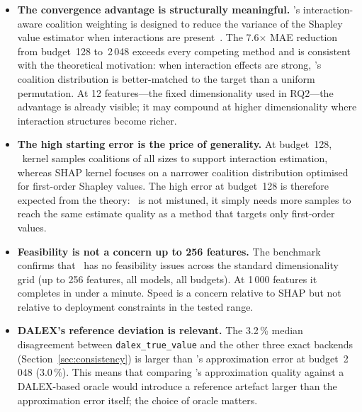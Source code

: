 \begin{itemize}

  \item \textbf{The convergence advantage is structurally meaningful.}
  \shapiq's interaction-aware coalition weighting is designed to reduce
  the variance of the Shapley value estimator when interactions are
  present~\cite{shapiq2024}.
  The 7.6$\times$ MAE reduction from budget~128 to~2\,048 exceeds every
  competing method and is consistent with the theoretical motivation:
  when interaction effects are strong, \shapiq's coalition distribution
  is better-matched to the target than a uniform permutation.
  At 12 features---the fixed dimensionality used in RQ2---the advantage
  is already visible; it may compound at higher dimensionality where
  interaction structures become richer.

  \item \textbf{The high starting error is the price of generality.}
  At budget~128, \shapiq\ kernel samples coalitions of all sizes to
  support interaction estimation, whereas SHAP kernel focuses on a
  narrower coalition distribution optimised for first-order Shapley values.
  The high error at budget~128 is therefore expected from the theory:
  \shapiq\ is not mistuned, it simply needs more samples to reach the same
  estimate quality as a method that targets only first-order values.

  \item \textbf{Feasibility is not a concern up to 256 features.}
  The benchmark confirms that \shapiq\ has no feasibility issues across
  the standard dimensionality grid (up to 256 features, all models,
  all budgets).
  At 1\,000 features it completes in under a minute.
  Speed is a concern relative to SHAP but not relative to deployment
  constraints in the tested range.

  \item \textbf{DALEX's reference deviation is relevant.}
  The 3.2\,\% median disagreement between \texttt{dalex\_true\_value} and
  the other three exact backends (Section~\ref{sec:consistency}) is larger
  than \shapiq's approximation error at budget~2\,048 (3.0\,\%).
  This means that comparing \shapiq's approximation quality against a
  DALEX-based oracle would introduce a reference artefact larger than the
  approximation error itself; the choice of oracle matters.

\end{itemize}

